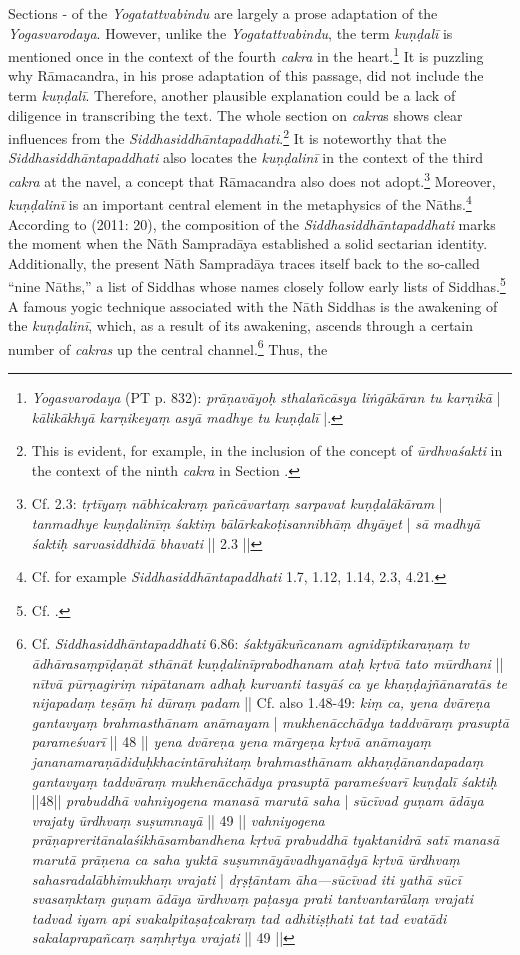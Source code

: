 Sections - of the \emph{Yogatattvabindu} are largely a prose adaptation of the \textit{Yogasvarodaya}. However, unlike the \emph{Yogatattvabindu}, the term \textit{kuṇḍalī} is mentioned once in the context of the fourth \textit{cakra} in the heart.\footnote{\emph{Yogasvarodaya} (PT p. 832): \textit{prāṇavāyoḥ sthalañcāsya liṅgākāran tu karṇikā} | \textit{kālikākhyā karṇikeyaṃ asyā madhye tu kuṇḍalī} |.} It is puzzling why Rāmacandra, in his prose adaptation of this passage, did not include the term \textit{kuṇḍalī}. Therefore, another plausible explanation could be a lack of diligence in transcribing the text. The whole section on \textit{cakra}s shows clear influences from the \textit{Siddhasiddhāntapaddhati}.\footnote{This is evident, for example, in the inclusion of the concept of \textit{ūrdhvaśakti} in the context of the ninth \textit{cakra} in Section .} It is noteworthy that the \textit{Siddhasiddhāntapaddhati} also locates the \textit{kuṇḍalinī} in the context of the third \textit{cakra} at the navel, a concept that Rāmacandra also does not adopt.\footnote{Cf.  2.3: \textit{tṛtīyaṃ nābhicakraṃ pañcāvartaṃ sarpavat kuṇḍalākāram} | \textit{tanmadhye kuṇḍalinīṃ śaktiṃ bālārkakoṭisannibhāṃ dhyāyet} | \textit{sā madhyā śaktiḥ sarvasiddhidā bhavati} || 2.3 ||} Moreover, \textit{kuṇḍalinī} is an important central element in the metaphysics of the Nāths.\footnote{Cf. for example \textit{Siddhasiddhāntapaddhati} 1.7, 1.12, 1.14, 2.3, 4.21.} According to \citeauthor{mallinsonnath} (2011: 20), the composition of the \textit{Siddhasiddhāntapaddhati} marks the moment when the Nāth Sampradāya established a solid sectarian identity. Additionally, the present Nāth Sampradāya traces itself back to the so-called ``nine Nāths,'' a list of Siddhas whose names closely follow early lists of Siddhas.\footnote{Cf. \citeauthor[2011: 5]{mallinsonnath}.} A famous yogic technique associated with the Nāth Siddhas is the awakening of the \textit{kuṇḍalinī}, which, as a result of its awakening, ascends through a certain number of \textit{cakras} up the central channel.\footnote{Cf. \textit{Siddhasiddhāntapaddhati} 6.86: \textit{śaktyākuñcanam agnidīptikaraṇaṃ tv ādhārasaṃpīḍaṇāt sthānāt kuṇḍalinīprabodhanam ataḥ kṛtvā tato mūrdhani} || \textit{nītvā pūrṇagiriṃ nipātanam adhaḥ kurvanti tasyāś ca ye khaṇḍajñānaratās te nijapadaṃ teṣāṃ hi dūraṃ padam} || Cf. also  1.48-49: \textit{kiṃ ca, yena dvāreṇa gantavyaṃ brahmasthānam anāmayam} | \textit{mukhenācchādya taddvāraṃ prasuptā parameśvarī} || 48 || \textit{yena dvāreṇa yena mārgeṇa kṛtvā anāmayaṃ jananamaraṇādiduḥkhacintārahitaṃ brahmasthānam akhaṇḍānandapadaṃ gantavyaṃ taddvāraṃ mukhenācchādya prasuptā parameśvarī kuṇḍalī śaktiḥ} ||48|| \textit{prabuddhā vahniyogena manasā marutā saha} | \textit{sūcīvad guṇam ādāya vrajaty ūrdhvaṃ suṣumnayā} || 49 || \textit{vahniyogena prāṇapreritānalaśikhāsambandhena kṛtvā prabuddhā tyaktanidrā satī manasā marutā prāṇena ca saha yuktā suṣumnāyāvadhyanāḍyā kṛtvā ūrdhvaṃ sahasradalābhimukhaṃ vrajati} | \textit{dṛṣṭāntam āha—sūcīvad iti yathā sūcī svasaṃktaṃ guṇam ādāya ūrdhvaṃ paṭasya prati tantvantarālaṃ vrajati tadvad iyam api svakalpitaṣaṭcakraṃ tad adhitiṣṭhati tat tad evatādi sakalaprapañcaṃ saṃhṛtya vrajati} || 49 ||} Thus, the 